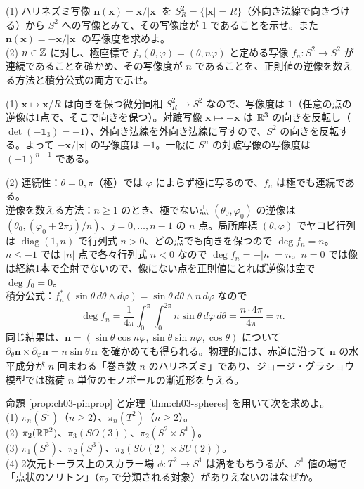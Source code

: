 \begin{problem}[難易度 A]\label{ch03-prob-degex}
(1) ハリネズミ写像 $\bm n(\bm x)=\bm x/\lvert\bm x\rvert$ を $S^2_R=\{\lvert\bm x\rvert=R\}$（外向き法線で向きづける）から $S^2$ への写像とみて、その写像度が $1$ であることを示せ。また $\bm n(\bm x)=-\bm x/\lvert\bm x\rvert$ の写像度を求めよ。\\
(2) $n\in\mathbb{Z}$ に対し、極座標で $f_n(\theta,\varphi)=(\theta,n\varphi)$ と定める写像 $f_n\colon S^2\to S^2$ が連続であることを確かめ、その写像度が $n$ であることを、正則値の逆像を数える方法と積分公式の両方で示せ。
\end{problem}

\begin{solution}
(1) $\bm x\mapsto\bm x/R$ は向きを保つ微分同相 $S^2_R\to S^2$ なので、写像度は $1$（任意の点の逆像は1点で、そこで向きを保つ）。対蹠写像 $\bm x\mapsto-\bm x$ は $\mathbb{R}^3$ の向きを反転し（$\det(-\mathbf 1_3)=-1$）、外向き法線を外向き法線に写すので、$S^2$ の向きを反転する。よって $-\bm x/\lvert\bm x\rvert$ の写像度は $-1$。一般に $S^n$ の対蹠写像の写像度は $(-1)^{n+1}$ である。

(2) 連続性：$\theta=0,\pi$（極）では $\varphi$ によらず極に写るので、$f_n$ は極でも連続である。\\
逆像を数える方法：$n\ge1$ のとき、極でない点 $(\theta_0,\varphi_0)$ の逆像は $(\theta_0,(\varphi_0+2\pi j)/n)$、$j=0,\dots,n-1$ の $n$ 点。局所座標 $(\theta,\varphi)$ でヤコビ行列は $\operatorname{diag}(1,n)$ で行列式 $n>0$、どの点でも向きを保つので $\deg f_n=n$。$n\le-1$ では $\lvert n\rvert$ 点で各々行列式 $n<0$ なので $\deg f_n=-\lvert n\rvert=n$。$n=0$ では像は経線1本で全射でないので、像にない点を正則値にとれば逆像は空で $\deg f_0=0$。\\
積分公式：$f_n^*(\sin\theta\,d\theta\wedge d\varphi)=\sin\theta\,d\theta\wedge n\,d\varphi$ なので
\[
\deg f_n=\frac{1}{4\pi}\int_0^\pi\!\!\int_0^{2\pi}n\sin\theta\,d\varphi\,d\theta=\frac{n\cdot4\pi}{4\pi}=n .
\]
同じ結果は、$\bm n=(\sin\theta\cos n\varphi,\sin\theta\sin n\varphi,\cos\theta)$ について $\partial_\theta\bm n\times\partial_\varphi\bm n=n\sin\theta\,\bm n$ を確かめても得られる。物理的には、赤道に沿って $\bm n$ の水平成分が $n$ 回まわる「巻き数 $n$ のハリネズミ」であり、ジョージ・グラショウ模型では磁荷 $n$ 単位のモノポールの漸近形を与える。
\end{solution}

\begin{problem}[難易度 A]\label{ch03-prob-table}
命題 \ref{prop:ch03-pinprop} と定理 \ref{thm:ch03-spheres} を用いて次を求めよ。\\
(1) $\pi_n(S^1)$（$n\ge2$）、$\pi_n(T^2)$（$n\ge2$）。\\
(2) $\pi_2(\mathbb{RP}^2)$、$\pi_3(SO(3))$、$\pi_2(S^2\times S^1)$。\\
(3) $\pi_1(S^3)$、$\pi_2(S^3)$、$\pi_3(SU(2)\times SU(2))$。\\
(4) 2次元トーラス上のスカラー場 $\phi\colon T^2\to S^1$ は渦をもちうるが、$S^1$ 値の場で「点状のソリトン」（$\pi_2$ で分類される対象）がありえないのはなぜか。
\end{problem}

